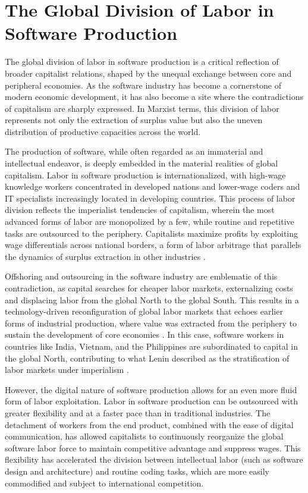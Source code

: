 \section{The Global Division of Labor in Software Production}

The global division of labor in software production is a critical reflection of broader capitalist relations, shaped by the unequal exchange between core and peripheral economies. As the software industry has become a cornerstone of modern economic development, it has also become a site where the contradictions of capitalism are sharply expressed. In Marxist terms, this division of labor represents not only the extraction of surplus value but also the uneven distribution of productive capacities across the world.

The production of software, while often regarded as an immaterial and intellectual endeavor, is deeply embedded in the material realities of global capitalism. Labor in software production is internationalized, with high-wage knowledge workers concentrated in developed nations and lower-wage coders and IT specialists increasingly located in developing countries. This process of labor division reflects the imperialist tendencies of capitalism, wherein the most advanced forms of labor are monopolized by a few, while routine and repetitive tasks are outsourced to the periphery. Capitalists maximize profits by exploiting wage differentials across national borders, a form of labor arbitrage that parallels the dynamics of surplus extraction in other industries \cite[pp.~75-77]{harvey2001}. 

Offshoring and outsourcing in the software industry are emblematic of this contradiction, as capital searches for cheaper labor markets, externalizing costs and displacing labor from the global North to the global South. This results in a technology-driven reconfiguration of global labor markets that echoes earlier forms of industrial production, where value was extracted from the periphery to sustain the development of core economies \cite[pp.~223-225]{smith2016}. In this case, software workers in countries like India, Vietnam, and the Philippines are subordinated to capital in the global North, contributing to what Lenin described as the stratification of labor markets under imperialism \cite[pp.~81-83]{lenin1917}.

However, the digital nature of software production allows for an even more fluid form of labor exploitation. Labor in software production can be outsourced with greater flexibility and at a faster pace than in traditional industries. The detachment of workers from the end product, combined with the ease of digital communication, has allowed capitalists to continuously reorganize the global software labor force to maintain competitive advantage and suppress wages. This flexibility has accelerated the division between intellectual labor (such as software design and architecture) and routine coding tasks, which are more easily commodified and subject to international competition.

